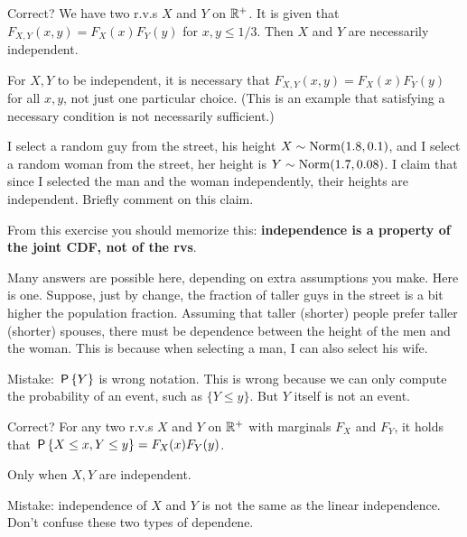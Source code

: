 \documentclass[assignments]{subfiles}
\begin{document}


\begin{exercise}
Correct? We have two r.v.s $X$ and $Y$ on $\R^{+}$. It is given that $F_{X,Y}(x,y) = F_X(x)F_Y(y)$ for $x,y \leq 1/3$. Then  $X$ and $Y$ are necessarily independent.
\begin{solution}
For $X, Y$ to be independent, it is necessary that  $F_{X,Y}(x,y) = F_X(x)F_Y(y)$ for all $x,y$, not just one particular choice. (This is an example that satisfying a necessary condition is not necessarily sufficient.)
\end{solution}
\end{exercise}

\begin{exercise}
I select a random guy from the street, his height $X\sim\Norm{1.8, 0.1}$, and I select a random woman from the street, her height is $Y\sim\Norm{1.7, 0.08}$.
I claim that since I selected the man and the woman independently, their heights are independent.
Briefly comment on this claim.
\begin{hint}
From this exercise you should memorize this: \textbf{independence is a property of the joint CDF, not of the rvs}.
\end{hint}
\begin{solution}
  Many answers are possible here, depending on extra assumptions you make.
  Here is one.
  Suppose, just by change, the fraction of taller guys in the street is a bit higher the population fraction.
  Assuming that taller (shorter) people prefer taller (shorter) spouses, there must be dependence between the height of the men and the woman. This is because when selecting a man, I can also select his wife.

Mistake:   $\P{Y}$ is wrong notation. This is wrong because we can only compute the probability of an event, such as $\{Y\leq y\}$. But $Y$ itself is not an event.
\end{solution}
\end{exercise}


\begin{exercise}
Correct? For any two r.v.s $X$ and $Y$ on $\R^{+}$ with marginals $F_{X}$ and $F_{Y}$, it holds that $\P{X\leq x, Y\leq y} = F_{X}(x) F_{Y}(y)$.
\begin{solution}
Only when $X, Y$ are independent.

Mistake:  independence of $X$ and $Y$ is not the same as the linear independence. Don't confuse these two types of dependene.
\end{solution}

\end{exercise}
\end{document}
